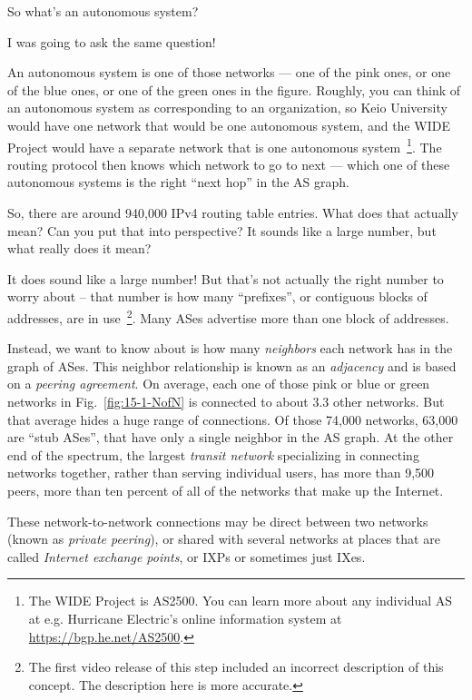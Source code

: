 \rrr So what's an autonomous system?

\mmm I was going to ask the same question!

\rrr An autonomous system is one of those networks --- one of the pink ones, or one of the blue ones, or one of the green ones in the figure. Roughly, you can think of an autonomous system as corresponding to an organization, so Keio University would have one network that would be one autonomous system, and the WIDE Project would have a separate network that is one autonomous system~\footnote{The WIDE Project is AS2500. You can learn more about any individual AS at e.g. Hurricane Electric's online information system at \url{https://bgp.he.net/AS2500}.}. The routing protocol then knows which network to go to next --- which one of these autonomous systems is the right ``next hop'' in the AS graph.

\mmm So, there are around 940,000 IPv4 routing table entries. What does that actually mean? Can you put that into perspective? It sounds like a large number, but what really does it mean?

\rrr It does sound like a large number! But that's not actually the right number to worry about -- that number is how many ``prefixes'', or contiguous blocks of addresses, are in use~\footnote{The first video release of this step included an incorrect description of this concept. The description here is more accurate.}.  Many ASes advertise more than one block of addresses.

Instead, we want to know about is how many \emph{neighbors} each network has in the graph of ASes.  This neighbor relationship is known as an \emph{adjacency} and is based on a \emph{peering agreement}.
On average, each one of those pink or blue or green networks in Fig.~\ref{fig:15-1-NofN} is connected to about 3.3 other networks. But that average hides a huge range of connections. Of those 74,000 networks, 63,000 are ``stub ASes'', that have only a single neighbor in the AS graph. At the other end of the spectrum, the largest \emph{transit network} specializing in connecting networks together, rather than serving individual users, has more than 9,500 peers, more than ten percent of all of the networks that make up the Internet.

These network-to-network connections may be direct between two networks (known as \emph{private peering}), or shared with several networks at places that are called \emph{Internet exchange points}, or IXPs or sometimes just IXes.

